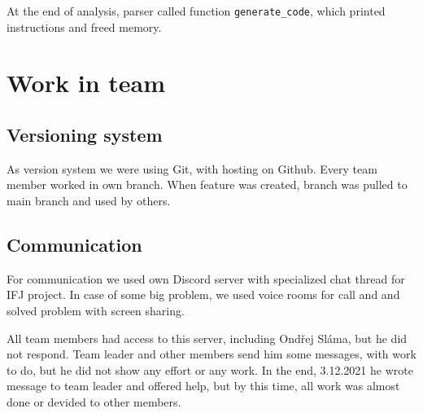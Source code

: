 \documentclass[11pt]{article}
\begin{document}
At the end of analysis, parser called function \texttt{generate\_code}, which printed instructions and freed memory.

\section{Work in team}
\subsection{Versioning system}
As version system we were using Git, with hosting on Github. Every team member worked in own branch. When feature was created, branch was
pulled to main branch and used by others.
\subsection{Communication}
For communication we used own Discord server with specialized chat thread for IFJ project. In case of some big problem, we used voice rooms for call and
and solved problem with screen sharing.

All team members had access to this server, including Ondřej Sláma, but he did not respond. Team leader and other members send him some messages, with work to do, but he did not 
show any effort or any work. In the end, 3.12.2021 he wrote message to team leader and offered help, but by this time, all work was almost done or devided to 
other members. 
\end{document}
